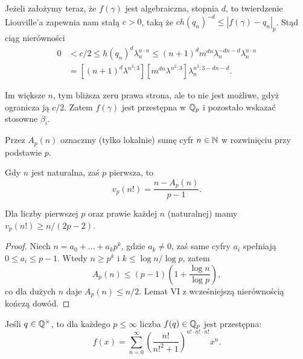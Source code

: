 Jeżeli założymy teraz, że $f(\gamma)$ jest algebraiczna, stopnia $d$, to twierdzenie Liouville'a zapewnia nam stałą $c > 0$, taką że $c h(q_n)^{-d} \le |f(\gamma) - q_n|_p$.
Stąd ciąg nierówności
\begin{align*}
	0 & < c/2 \le h(q_n)^d \lambda_n^{n \cdot n} \le (n+1)^d m^{dn} \lambda_n^{-dn-d} \lambda_n^{n \cdot n} \\
	& = [(n+1)^d \lambda^{n^2:3}] [m^{dn} \lambda^{n^2:3}] \lambda_n^{n^2:3-dn-d}.
\end{align*}

Im większe $n$, tym bliższa zeru prawa strona, ale to nie jest możliwe, gdyż ogranicza ją $c/2$.
Zatem $f(\gamma)$ jest przestępna w $\mathbb Q_p$ i pozostało wskazać stosowne $\beta_i$.

Przez $A_p(n)$ oznaczmy (tylko lokalnie) sumę cyfr $n \in \mathbb N$ w rozwinięciu przy podstawie $p$.

\begin{lemat}[VI]
	Gdy $n$ jest naturalna, zaś $p$ pierwsza, to
	\[
		v_p(n!) = \frac{n-A_p(n)}{p-1}.
	\]
\end{lemat}

\begin{wniosek}[VII]
	Dla liczby pierwszej $p$ oraz prawie każdej $n$ (naturalnej) mamy $v_p(n!) \ge n/(2p-2)$.
\end{wniosek}

\begin{proof}
	Niech $n = a_0 + \ldots + a_k p^k$, gdzie $a_k \neq 0$, zaś same cyfry $a_i$ spełniają $0 \le a_i \le p-1$.
	Wtedy $n \ge p^k$ i $k \le \log n / \log p$, zatem
	\[
		A_p(n) \le (p-1) \left(1+ \frac{\log n}{\log p}\right),
	\]
	co dla dużych $n$ daje $A_p(n) \le n/2$.
	Lemat VI z wcześniejszą nierównością kończą dowód.
\end{proof}

\begin{fakt}
	Jeśli $q \in \mathbb Q^\times$, to dla każdego $p \le \infty$ liczba $f(q) \in \mathbb Q_p$ jest przestępna:
	\[
		f(x) = \sum_{n=0}^\infty \left(\frac{n!}{n!^2+1}\right)^{n! \cdot n! \cdot n!} x^n.
	\]
\end{fakt}

